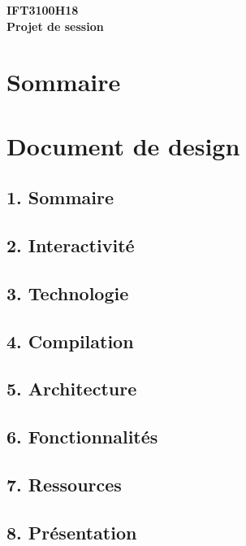 \documentclass[12pt]{article}
\begin{document}
\begin{center}
{\scriptsize \textbf{IFT3100H18\\}}
\textbf{Projet de session\\}
\end{center}

\section*{Sommaire}

\pagebreak

\section*{Document de design}

\subsection*{1. Sommaire}

\subsection*{2. Interactivité}

\subsection*{3. Technologie}

\subsection*{4. Compilation}

\subsection*{5. Architecture}

\subsection*{6. Fonctionnalités}

\subsection*{7. Ressources}

\subsection*{8. Présentation}
\end{document}
